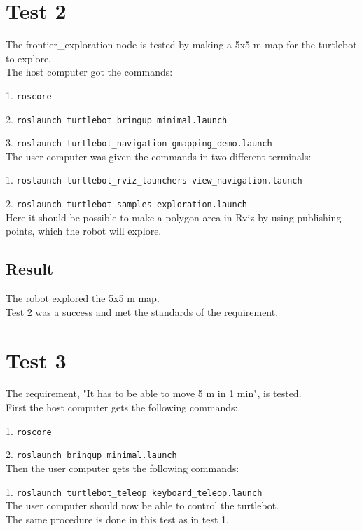 %
%
%
%

\section{Test 2}
The frontier\_exploration node is tested by making a 5x5 m map for the turtlebot to explore.\\
\newline
The host computer got the commands:

1. \texttt{roscore} 

2. \texttt{roslaunch turtlebot\_bringup minimal.launch}

3. \texttt{roslaunch turtlebot\_navigation gmapping\_demo.launch}\\
The user computer was given the commands in two different terminals:

1. \texttt{roslaunch turtlebot\_rviz\_launchers view\_navigation.launch}

2. \texttt{roslaunch turtlebot\_samples exploration.launch}\\
Here it should be possible to make a polygon area in Rviz by using publishing points, which the robot will explore.

\subsection{Result}
The robot explored the 5x5 m map.\\
Test 2 was a success and met the standards of the requirement.

%
%
%
%

\section{Test 3}
The requirement, "It has to be able to move 5 m in 1 min", is tested.\\ 
\newline
First the host computer gets the following commands:

1. \texttt{roscore}

2. \texttt{roslaunch\_bringup minimal.launch}\\
Then the user computer gets the following commands:

1. \texttt{roslaunch turtlebot\_teleop keyboard\_teleop.launch}\\
The user computer should now be able to control the turtlebot.\\
The same procedure is done in this test as in test 1.


